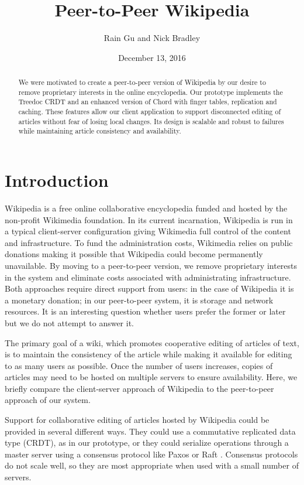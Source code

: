 \documentclass[twocolumn]{article}
\title{Peer-to-Peer Wikipedia}
\author{Rain Gu and Nick Bradley}
\date{December 13, 2016}
\begin{document}
\maketitle

\begin{abstract}
We were motivated to create a peer-to-peer version of Wikipedia by our desire to remove proprietary interests in the online encyclopedia. Our prototype implements the Treedoc CRDT and an enhanced version of Chord with finger tables, replication and caching. These features allow our client application to support disconnected editing of articles without fear of losing local changes. Its design is scalable and robust to failures while maintaining article consistency and availability.
\end{abstract}

\section{Introduction}
Wikipedia is a free online collaborative encyclopedia funded and hosted by the non-profit Wikimedia foundation. In its current incarnation, Wikipedia is run in a typical client-server configuration giving Wikimedia full control of the content and infrastructure. To fund the administration costs, Wikimedia relies on public donations making it possible that Wikipedia could become permanently unavailable. By moving to a peer-to-peer version, we remove proprietary interests in the system and eliminate costs associated with administrating infrastructure. Both approaches require direct support from users: in the case of Wikipedia it is a monetary donation; in our peer-to-peer system, it is storage and network resources. It is an interesting question whether users prefer the former or later but we do not attempt to answer it.

The primary goal of a wiki, which promotes cooperative editing of articles of text, is to maintain the consistency of the article while making it available for editing to as many users as possible. Once the number of users increases, copies of articles may need to be hosted on multiple servers to ensure availability. Here, we briefly compare the client-server approach of Wikipedia to the peer-to-peer approach of our system.

Support for collaborative editing of articles hosted by Wikipedia could be provided in several different ways. They could use a commutative replicated data type (CRDT), as in our prototype, or they could serialize operations through a master server using a consensus protocol like Paxos \cite{paxos} or Raft \cite{raft}. Consensus protocols do not scale well, so they are most appropriate when used with a small number of servers.
\end{document}
